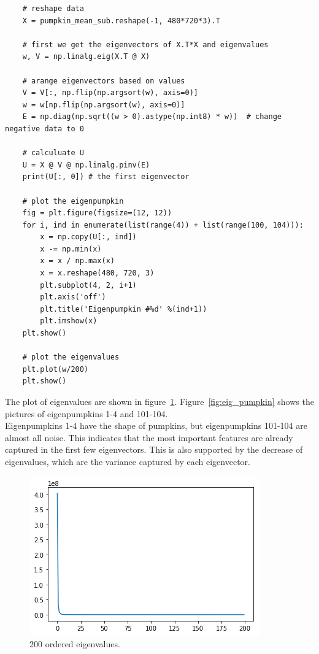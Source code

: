 \documentclass{article}
\begin{document}
	\begin{lstlisting}
	# reshape data 
	X = pumpkin_mean_sub.reshape(-1, 480*720*3).T

	# first we get the eigenvectors of X.T*X and eigenvalues
	w, V = np.linalg.eig(X.T @ X)

	# arange eigenvectors based on values
	V = V[:, np.flip(np.argsort(w), axis=0)]
	w = w[np.flip(np.argsort(w), axis=0)]
	E = np.diag(np.sqrt((w > 0).astype(np.int8) * w))  # change negative data to 0

	# calculuate U
	U = X @ V @ np.linalg.pinv(E)
	print(U[:, 0]) # the first eigenvector
	
	# plot the eigenpumpkin
	fig = plt.figure(figsize=(12, 12))
	for i, ind in enumerate(list(range(4)) + list(range(100, 104))):
		x = np.copy(U[:, ind])
		x -= np.min(x)
		x = x / np.max(x)
		x = x.reshape(480, 720, 3)
		plt.subplot(4, 2, i+1)
		plt.axis('off')
		plt.title('Eigenpumpkin #%d' %(ind+1))
		plt.imshow(x)
	plt.show()
	
	# plot the eigenvalues
	plt.plot(w/200)
	plt.show()
	\end{lstlisting}
	
	The plot of eigenvalues are shown in figure~\ref{fig:evals}. Figure~\ref{fig:eig_pumpkin} shows the pictures of eigenpumpkins 1-4 and 101-104.\\
	Eigenpumpkins 1-4 have the shape of pumpkins, but eigenpumpkins 101-104 are almost all noise. This indicates that the most important features are already captured in the first few eigenvectors. This is also supported by the decrease of eigenvalues, which are the variance captured by each eigenvector. 
	\begin{figure}[h!]
	\centering
	\includegraphics[width=0.7\linewidth]{images/1_b_eval.png}
	\caption{200 ordered eigenvalues.}
	\label{fig:evals}
	\end{figure}
	
\end{document}
